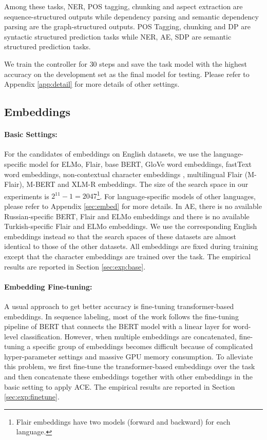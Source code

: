 \documentclass[11pt,a4paper]{article}
\begin{document}
Among these tasks, NER, POS tagging, chunking and aspect extraction are sequence-structured outputs while dependency parsing and semantic dependency parsing are the graph-structured outputs. POS Tagging, chunking and DP are syntactic structured prediction tasks while NER, AE, SDP are semantic structured prediction tasks. 


We train the controller for $30$ steps and save the task model with the highest accuracy on the development set as the final model for testing. Please refer to Appendix \ref{app:detail} for more details of other settings.

\subsection{Embeddings}
\paragraph{Basic Settings:} For the candidates of embeddings on English datasets, we use the language-specific model for ELMo, Flair, base BERT, GloVe word embeddings, fastText word embeddings, non-contextual character embeddings \citep{lample-etal-2016-neural}, multilingual Flair (M-Flair), M-BERT and XLM-R embeddings. The size of the search space in our experiments is $2^{11}{-}1{=}2047$\footnote{Flair embeddings have two models (forward and backward) for each language.}. For language-specific models of other languages, please refer to Appendix \ref{sec:embed} for more details. In AE, there is no available Russian-specific BERT, Flair and ELMo embeddings and there is no available Turkish-specific Flair and ELMo embeddings. We use the corresponding English embeddings instead so that the search spaces of these datasets are almost identical to those of the other datasets. All embeddings are fixed during training except that the character embeddings are trained over the task. The empirical results are reported in Section \ref{sec:exp:base}.

\paragraph{Embedding Fine-tuning:} A usual approach to get better accuracy is fine-tuning transformer-based embeddings. In sequence labeling, most of the work follows the fine-tuning pipeline of BERT that connects the BERT model with a linear layer for word-level classification. 
However, when multiple embeddings are concatenated, fine-tuning a specific group of embeddings becomes difficult because of complicated hyper-parameter settings and massive GPU memory consumption. 
To alleviate this problem, we first fine-tune the transformer-based embeddings over the task and then concatenate these embeddings together with other embeddings in the basic setting to apply ACE. The empirical results are reported in Section \ref{sec:exp:finetune}.
\end{document}
